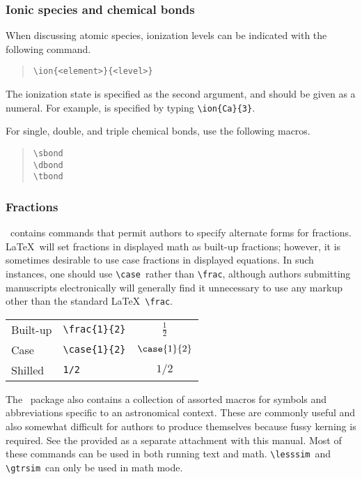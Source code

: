 \documentclass[preprint2]{aastex}
\begin{document}
\subsubsection{Ionic species and chemical bonds} 
 
When discussing atomic species, ionization levels can be indicated 
with the following command. 
\begin{quote} 
\begin{verbatim} 
\ion{<element>}{<level>} 
\end{verbatim} 
\end{quote} 
The ionization state is specified as the second argument, 
and should be given as a numeral. 
For example,  is specified by typing \verb"\ion{Ca}{3}". 
 
For single, double, and triple chemical bonds, use the following macros. 
\begin{quote} 
\begin{verbatim} 
\sbond 
\dbond 
\tbond 
\end{verbatim} 
\end{quote} 
 
 
 
 
\subsubsection{Fractions} 
 
\aastex\ contains commands that permit authors to specify alternate 
forms for fractions. 
\LaTeX\ will set fractions in displayed math as built-up fractions; 
however, it is sometimes desirable to use case fractions in 
displayed equations. 
In such instances, one should use \verb"\case"\ 
rather than \verb"\frac", although authors submitting 
manuscripts electronically 
will generally find it unnecessary to use any markup other than the 
standard \LaTeX\ \verb"\frac". 
 
\begin{center} 
\renewcommand{\arraystretch}{1.4} 
\begin{tabular}{@{}llc@{}} 
Built-up & \verb"\frac{1}{2}" & $\displaystyle\frac{1}{2}$ \\[.5ex] 
Case     & \verb"\case{1}{2}" & $\case{1}{2}$ \\ 
Shilled  & \verb"1/2" & $1/2$ \\ 
\end{tabular} 
\end{center} 
 
The \aastex\ package also contains a collection of assorted macros 
for symbols and abbreviations specific to an astronomical context. 
These are commonly useful and also somewhat difficult for authors 
to produce themselves because fussy kerning is required. 
See the  provided as 
a separate attachment with this manual. 
Most of these commands can be used in both running text and math. 
\verb"\lesssim"\  and \verb"\gtrsim"\  can only be used in math mode. 
 
\end{document}
